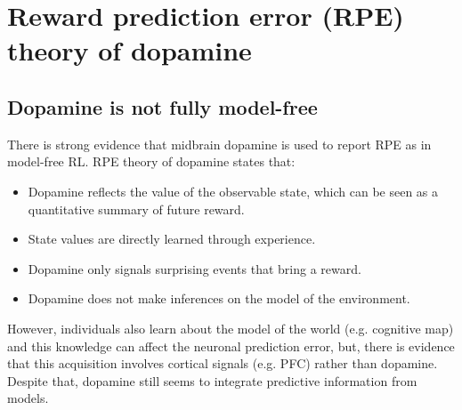 \section{Reward prediction error (RPE) theory of dopamine}


\subsection{Dopamine is not fully model-free}

There is strong evidence that midbrain dopamine is used to report RPE as in model-free RL.
RPE theory of dopamine states that:
\begin{itemize}
    \item Dopamine reflects the value of the observable state, which can be seen as a quantitative summary of future reward.
    \item State values are directly learned through experience.
    \item Dopamine only signals surprising events that bring a reward.
    \item Dopamine does not make inferences on the model of the environment.
\end{itemize}

However, individuals also learn about the model of the world (e.g. cognitive map) and this knowledge can affect the neuronal prediction error,
but, there is evidence that this acquisition involves cortical signals (e.g. PFC) rather than dopamine.
Despite that, dopamine still seems to integrate predictive information from models.

